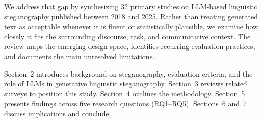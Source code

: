 We address that gap by synthesizing 32 primary studies on LLM-based linguistic steganography published between 2018 and 2025. Rather than treating generated text as acceptable whenever it is fluent or statistically plausible, we examine how closely it fits the surrounding discourse, task, and communicative context. The review maps the emerging design space, identifies recurring evaluation practices, and documents the main unresolved limitations.

Section~2 introduces background on steganography, evaluation criteria, and the role of LLMs in generative linguistic steganography. Section~3 reviews related surveys to position this study. Section~4 outlines the methodology. Section~5 presents findings across five research questions (RQ1--RQ5). Sections~6 and~7 discuss implications and conclude.

